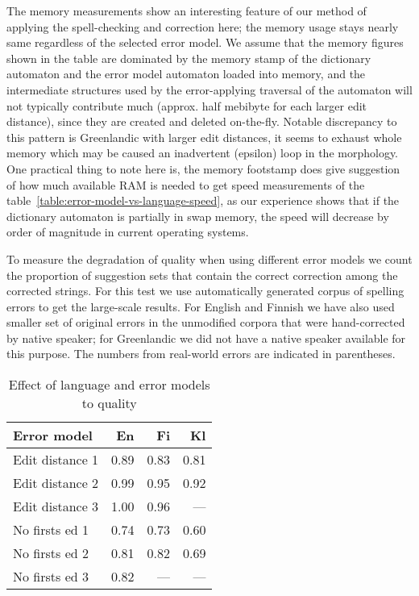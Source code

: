 \documentclass[11pt]{article}
\begin{document}
The memory measurements show an interesting feature of our method of applying
the spell-checking and correction here; the memory usage stays nearly same
regardless of the selected error model. We assume that the memory figures shown
in the table are dominated by the memory stamp of the dictionary automaton and
the error model automaton loaded into memory, and the intermediate structures
used by the error-applying traversal of the automaton will not typically
contribute much (approx. half mebibyte for each larger edit distance), since
they are created and deleted on-the-fly. Notable discrepancy to this pattern is
Greenlandic with larger edit distances, it seems to exhaust whole memory which
may be caused an inadvertent (epsilon) loop in the morphology. One practical
thing to note here is, the memory footstamp does give suggestion of how much
available RAM is needed to get speed measurements of the
table~\ref{table:error-model-vs-language-speed}, as our experience shows that
if the dictionary automaton is partially in swap memory, the speed will
decrease by order of magnitude in current operating systems.

To measure the degradation of quality when using different error models we
count the proportion of suggestion sets that contain the correct correction
among the corrected strings. For this test we use automatically generated corpus
of spelling errors to get the large-scale results. For English and Finnish we
have also used smaller set of original errors in the unmodified corpora that
were hand-corrected by native speaker; for Greenlandic we did not have a native
speaker available for this purpose. The numbers from real-world errors are 
indicated in parentheses.

\begin{table}[h]
\begin{center}
\begin{scriptsize}
\begin{tabular}{|l|rrr|}
\hline
\bf Error model & \bf En & \bf Fi & \bf Kl\\ 
\hline
\hline
\hline
Edit distance 1 &
0.89&0.83&0.81
\\
Edit distance 2 &
0.99&0.95&0.92
\\
Edit distance 3 &
1.00&0.96&---
\\
No firsts ed 1 & 
0.74&0.73&0.60
\\
No firsts ed 2 &
0.81&0.82&0.69
\\
No firsts ed 3 &
0.82&---&---
\\
\end{tabular}
\end{scriptsize}
\end{center}
\caption{\label{table:error-model-vs-language} Effect of language and 
error models to quality}
\end{table}
\end{document}
